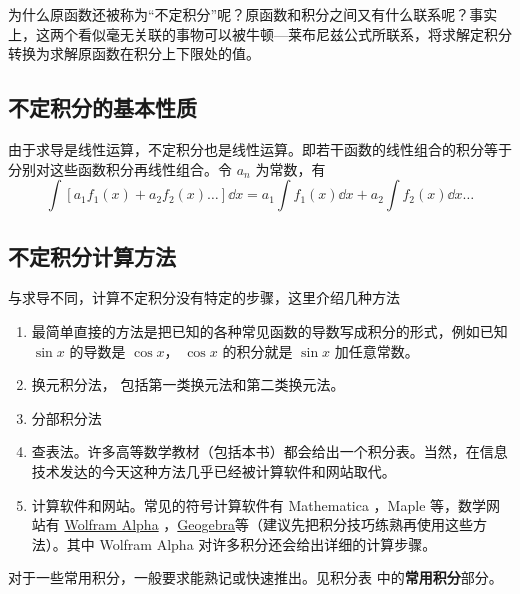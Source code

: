 为什么原函数还被称为“不定积分”呢？原函数和积分之间又有什么联系呢？事实上，这两个看似毫无关联的事物可以被牛顿—莱布尼兹公式所联系，将求解定积分转换为求解原函数在积分上下限处的值。

\subsection{不定积分的基本性质}

由于求导是线性运算，不定积分也是线性运算。即若干函数的线性组合的积分等于分别对这些函数积分再线性组合。令 $a_n$ 为常数，有
\begin{equation}\label{eq_Int_4}
\int [a_1 f_1(x) + a_2 f_2(x)\dots] \dd{x}  = a_1 \int f_1(x) \dd{x} + a_2 \int f_2(x) \dd{x} \dots
\end{equation}

\subsection{不定积分计算方法}
与求导不同，计算不定积分没有特定的步骤，这里介绍几种方法
\begin{enumerate}
\item 最简单直接的方法是把已知的各种常见函数的导数写成积分的形式，例如已知 $\sin x$ 的导数是 $\cos x$， $\cos x$ 的积分就是 $\sin x$ 加任意常数。
\item 换元积分法， 包括第一类换元法和第二类换元法。

\item 分部积分法

\item 查表法。许多高等数学教材（包括本书）都会给出一个积分表。当然，在信息技术发达的今天这种方法几乎已经被计算软件和网站取代。

\item 计算软件和网站。常见的符号计算软件有 Mathematica %
，Maple 等，数学网站有 \href{https://www.wolframalpha.com}{Wolfram Alpha}
，\href{https://www.geogebra.org}{Geogebra}等（建议先把积分技巧练熟再使用这些方法）。其中 Wolfram Alpha 对许多积分还会给出详细的计算步骤。
 \end{enumerate}

对于一些常用积分，一般要求能熟记或快速推出。见积分表 中的\textbf{常用积分}部分。
